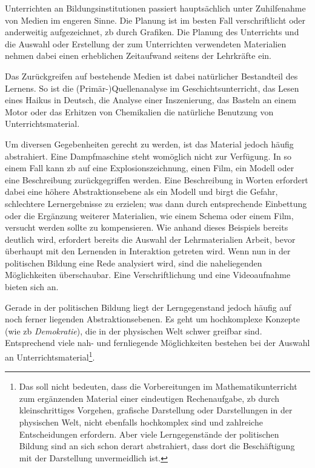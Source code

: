 Unterrichten an Bildungsinstitutionen passiert hauptsächlich unter Zuhilfenahme von Medien im engeren Sinne. Die Planung ist im besten Fall verschriftlicht oder anderweitig aufgezeichnet, \gls{zb} durch Grafiken. Die Planung des Unterrichts und die Auswahl oder Erstellung der zum Unterrichten verwendeten Materialien nehmen dabei einen erheblichen Zeitaufwand seitens der Lehrkräfte ein.

Das Zurückgreifen auf bestehende Medien ist dabei natürlicher Bestandteil des Lernens. So ist die (Primär-)Quellenanalyse im Geschichtsunterricht, das Lesen eines Haikus in Deutsch, die Analyse einer Inszenierung, das Basteln an einem Motor oder das Erhitzen von Chemikalien die natürliche Benutzung von Unterrichtsmaterial. 


Um diversen Gegebenheiten gerecht zu werden, ist das Material jedoch häufig abstrahiert. Eine Dampfmaschine steht womöglich nicht zur Verfügung. In so einem Fall kann \gls{zb} auf eine Explosionszeichnung, einen Film, ein Modell oder eine Beschreibung zurückgegriffen werden. Eine Beschreibung in Worten erfordert dabei eine höhere Abstraktionsebene als ein Modell und birgt die Gefahr, schlechtere Lernergebnisse zu erzielen; was dann durch entsprechende Einbettung oder die Ergänzung weiterer Materialien, wie einem Schema oder einem Film, versucht werden sollte zu kompensieren. Wie anhand dieses Beispiels bereits deutlich wird, erfordert bereits die Auswahl der Lehrmaterialien Arbeit, bevor überhaupt mit den Lernenden in Interaktion getreten wird. 
Wenn nun in der politischen Bildung eine Rede analysiert wird, sind die naheliegenden Möglichkeiten überschaubar. Eine Verschriftlichung und eine Videoaufnahme bieten sich an. 

Gerade in der politischen Bildung liegt der Lerngegenstand jedoch häufig auf noch ferner liegenden Abstraktionsebenen. Es geht um hochkomplexe Konzepte (wie \gls{zb} \emph{Demokratie}), die in der physischen Welt schwer greifbar sind. Entsprechend viele nah- und fernliegende Möglichkeiten bestehen bei der Auswahl an Unterrichtsmaterial\footnote{Das soll nicht bedeuten, dass die Vorbereitungen im Mathematikunterricht zum ergänzenden Material einer eindeutigen Rechenaufgabe, \gls{zb} durch kleinschrittiges Vorgehen, grafische Darstellung oder Darstellungen in der physischen Welt, nicht ebenfalls hochkomplex sind und zahlreiche Entscheidungen erfordern. Aber viele Lerngegenstände der politischen Bildung sind an sich schon derart abstrahiert, dass dort die Beschäftigung mit der Darstellung unvermeidlich ist.}.

